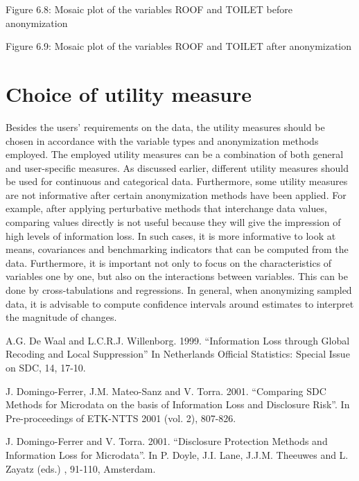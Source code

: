 \documentclass[letterpaper,10pt,english]{sphinxmanual}
\begin{document}
\noindent{}

Figure 6.8: Mosaic plot of the variables ROOF and TOILET before
anonymization

\noindent{}

Figure 6.9: Mosaic plot of the variables ROOF and TOILET after
anonymization


\section{Choice of utility measure}
\label{\detokenize{utility:choice-of-utility-measure}}
Besides the users’ requirements on the data, the utility measures should
be chosen in accordance with the variable types and anonymization
methods employed. The employed utility measures can be a combination of
both general and user-specific measures. As discussed earlier, different
utility measures should be used for continuous and categorical data.
Furthermore, some utility measures are not informative after certain
anonymization methods have been applied. For example, after applying
perturbative methods that interchange data values, comparing values
directly is not useful because they will give the impression of high
levels of information loss. In such cases, it is more informative to
look at means, covariances and benchmarking indicators that can be
computed from the data. Furthermore, it is important not only to focus
on the characteristics of variables one by one, but also on the
interactions between variables. This can be done by cross-tabulations
and regressions. In general, when anonymizing sampled data, it is
advisable to compute confidence intervals around estimates to interpret
the magnitude of changes.


A.G. De Waal and L.C.R.J. Willenborg. 1999. “Information Loss through
Global Recoding and Local Suppression” In Netherlands Official
Statistics: Special Issue on SDC, 14, 17-10.

J. Domingo-Ferrer, J.M. Mateo-Sanz and V. Torra. 2001. “Comparing SDC
Methods for Microdata on the basis of Information Loss and Disclosure
Risk”. In Pre-proceedings of ETK-NTTS 2001 (vol. 2), 807-826.

J. Domingo-Ferrer and V. Torra. 2001. “Disclosure Protection Methods and
Information Loss for Microdata”. In P. Doyle, J.I. Lane, J.J.M. Theeuwes
and L. Zayatz (eds.) , 91-110, Amsterdam.
\end{document}
